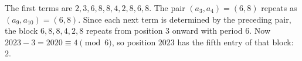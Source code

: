 The first terms are $2,3,6,8,8,4,2,8,6,8$. The pair $(a_3,a_4)=(6,8)$ repeats as $(a_9,a_{10})=(6,8)$. Since each next term is determined by the preceding pair, the block $6,8,8,4,2,8$ repeats from position $3$ onward with period $6$. Now $2023-3=2020\equiv4\pmod6$, so position $2023$ has the fifth entry of that block: $\boxed2$.
